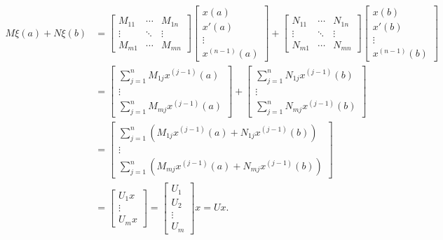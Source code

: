 \documentclass[11pt, oneside, a4paper]{article}
\begin{document}
\begin{align*}
    M\xi(a) + N\xi(b) &= \begin{bmatrix}
        M_{11} & \cdots & M_{1n}\\
        \vdots & \ddots & \vdots\\
        M_{m1} & \cdots & M_{mn}
    \end{bmatrix}\begin{bmatrix}x(a)\\ x'(a)\\ \vdots \\ x^{(n-1)}(a)
        \end{bmatrix} + \begin{bmatrix}
            N_{11} & \cdots & N_{1n}\\
            \vdots & \ddots & \vdots\\
            N_{m1} & \cdots & N_{mn}
        \end{bmatrix}\begin{bmatrix}x(b)\\ x'(b)\\ \vdots \\ x^{(n-1)}(b)
        \end{bmatrix}\\
        &= \begin{bmatrix}
            \sum_{j=1}^n M_{1j}x^{(j-1)}(a)\\
            \vdots\\
            \sum_{j=1}^n M_{mj}x^{(j-1)}(a)
        \end{bmatrix} + \begin{bmatrix}
            \sum_{j=1}^n N_{1j}x^{(j-1)}(b)\\
            \vdots\\
            \sum_{j=1}^n N_{mj}x^{(j-1)}(b)
        \end{bmatrix}\\
        &= \begin{bmatrix}
            \sum_{j=1}^n (M_{1j}x^{(j-1)}(a) + N_{1j}x^{(j-1)}(b))\\
            \vdots\\
            \sum_{j=1}^n (M_{mj}x^{(j-1)}(a) + N_{mj}x^{(j-1)}(b))
        \end{bmatrix}\\
        &= \begin{bmatrix}
            U_1 x\\
            \vdots\\
            U_m x
        \end{bmatrix} = \begin{bmatrix}U_1\\ U_2\\ \vdots \\ U_m
        \end{bmatrix}x = Ux.
\end{align*}
\end{document}

